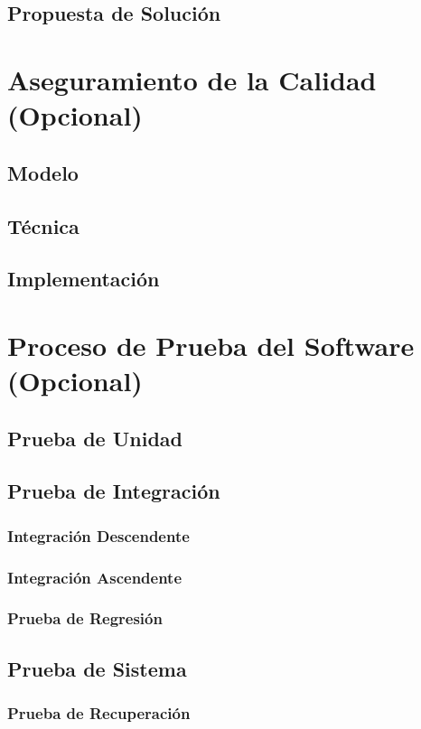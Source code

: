 \documentclass[letter,12pt]{report}
\newcommand\rojo[1]{\textcolor[rgb]{1,0,0}{#1}}
\begin{document}
\section{Propuesta de Solución}



\chapter{Aseguramiento de la Calidad (\rojo{Opcional})}\label{calidad}
\section{Modelo}
\section{Técnica}
\section{Implementación}

\chapter{Proceso de Prueba del Software (\rojo{Opcional})}\label{prueba}
\section{Prueba de Unidad}
\section{Prueba de Integración}
\subsection{Integración Descendente}
\subsection{Integración Ascendente}
\subsection{Prueba de Regresión}
\section{Prueba de Sistema}
\subsection{Prueba de Recuperación}
\end{document}
